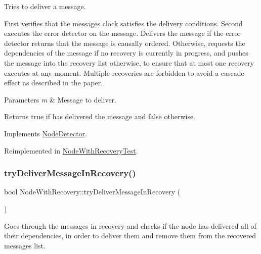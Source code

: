 Tries to deliver a message. 

First verifies that the message\textquotesingle{}s clock satisfies the delivery conditions. Second executes the error detector on the message. Delivers the message if the error detector returns that the message is causally ordered. Otherwise, requests the dependencies of the message if no recovery is currently in progress, and pushes the message into the recovery list otherwise, to ensure that at most one recovery executes at any moment. Multiple recoveries are forbidden to avoid a cascade effect as described in the paper. 
\begin{DoxyParams}{Parameters}
{\em m} & Message to deliver. \\
\hline
\end{DoxyParams}
\begin{DoxyReturn}{Returns}
true if has delivered the message and false otherwise. 
\end{DoxyReturn}


Implements \hyperlink{class_node_detector_a51e7dccd54e94bbe937752ca39dfdba4}{Node\+Detector}.



Reimplemented in \hyperlink{class_node_with_recovery_test_af9b78d0ed4fefb97e2f54c9279aa4655}{Node\+With\+Recovery\+Test}.

\mbox{\label{class_node_with_recovery_a87a1ce8071c9c587b878636f79163e7e}} 
\subsubsection{\texorpdfstring{try\+Deliver\+Message\+In\+Recovery()}{tryDeliverMessageInRecovery()}}
{\footnotesize\ttfamily bool Node\+With\+Recovery\+::try\+Deliver\+Message\+In\+Recovery (\begin{DoxyParamCaption}{ }\end{DoxyParamCaption})\hspace{0.3cm}{\ttfamily [protected]}}



Goes through the messages in recovery and checks if the node has delivered all of their dependencies, in order to deliver them and remove them from the recovered messages list. 

